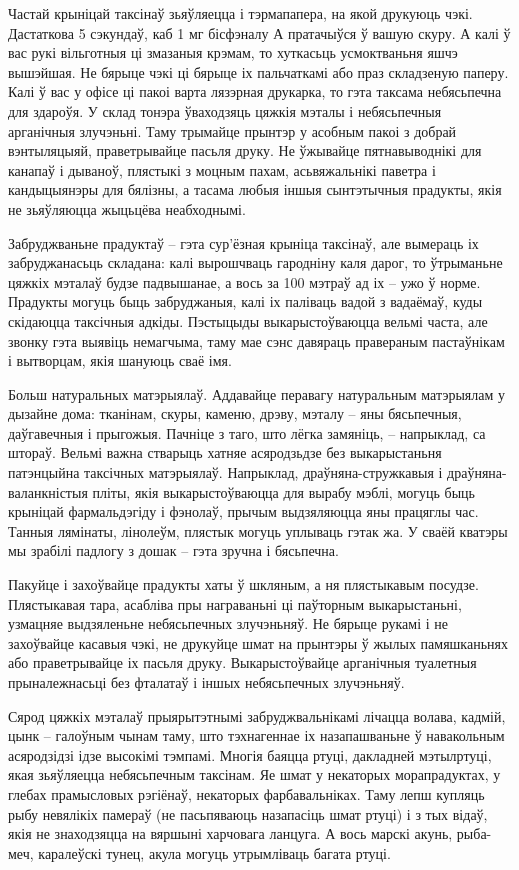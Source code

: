 Частай крыніцай таксінаў зьяўляецца і тэрмапапера, на якой друкуюць чэкі. Дастаткова 5 сэкундаў, каб 1 мг бісфэналу А пратачыўся ў вашую скуру. А калі ў вас рукі вільготныя ці змазаныя крэмам, то хуткасьць усмоктваньня яшчэ вышэйшая. Не бярыце чэкі ці бярыце іх пальчаткамі або праз складзеную паперу. Калі ў вас у офісе ці пакоі варта лязэрная друкарка, то гэта таксама небясьпечна для здароўя. У склад тонэра ўваходзяць цяжкія мэталы і небясьпечныя арганічныя злучэньні. Таму трымайце прынтэр у асобным пакоі з добрай вэнтыляцыяй, праветрывайце пасьля друку. Не ўжывайце пятнавыводнікі для канапаў і дываноў, плястыкі з моцным пахам, асьвяжальнікі паветра і кандыцыянэры для бялізны, а тасама любыя іншыя сынтэтычныя прадукты, якія не зьяўляюцца жыцьцёва неабходнымі.

Забруджваньне прадуктаў – гэта сур'ёзная крыніца таксінаў, але вымераць іх забруджанасьць складана: калі вырошчваць гародніну каля дарог, то ўтрыманьне цяжкіх мэталаў будзе падвышанае, а вось за 100 мэтраў ад іх – ужо ў норме. Прадукты могуць быць забруджаныя, калі іх паліваць вадой з вадаёмаў, куды скідаюцца таксічныя адкіды. Пэстыцыды выкарыстоўваюцца вельмі часта, але звонку гэта выявіць немагчыма, таму мае сэнс давяраць правераным пастаўнікам і вытворцам, якія шануюць сваё імя.

Больш натуральных матэрыялаў. Аддавайце перавагу натуральным матэрыялам у дызайне дома: тканінам, скуры, каменю, дрэву, мэталу – яны бясьпечныя, даўгавечныя і прыгожыя. Пачніце з таго, што лёгка замяніць, – напрыклад, са штораў. Вельмі важна стварыць хатняе асяродзьдзе без выкарыстаньня патэнцыйна таксічных матэрыялаў. Напрыклад, драўняна-стружкавыя і драўняна-валанкністыя пліты, якія выкарыстоўваюцца для вырабу мэблі, могуць быць крыніцай фармальдэгіду і фэнолаў, прычым выдзяляюцца яны працяглы час. Танныя лямінаты, лінолеўм, плястык могуць уплываць гэтак жа. У сваёй кватэры мы зрабілі падлогу з дошак – гэта зручна і бясьпечна.

Пакуйце і захоўвайце прадукты хаты ў шкляным, а ня плястыкавым посудзе. Плястыкавая тара, асабліва пры награваньні ці паўторным выкарыстаньні, узмацняе выдзяленьне небясьпечных злучэньняў. Не бярыце рукамі і не захоўвайце касавыя чэкі, не друкуйце шмат на прынтэры ў жылых памяшканьнях або праветрывайце іх пасьля друку. Выкарыстоўвайце арганічныя туалетныя прыналежнасьці без фталатаў і іншых небясьпечных злучэньняў.

Сярод цяжкіх мэталаў прыярытэтнымі забруджвальнікамі лічацца волава, кадмій, цынк – галоўным чынам таму, што тэхнагеннае іх назапашваньне ў навакольным асяродзідзі ідзе высокімі тэмпамі. Многія баяцца ртуці, дакладней мэтылртуці, якая зьяўляецца небясьпечным таксінам. Яе шмат у некаторых морапрадуктах, у глебах прамысловых рэгіёнаў, некаторых фарбавальніках. Таму лепш купляць рыбу невялікіх памераў (не пасьпяваюць назапасіць шмат ртуці) і з тых відаў, якія не знаходзяцца на вяршыні харчовага ланцуга. А вось марскі акунь, рыба-меч, каралеўскі тунец, акула могуць утрымліваць багата ртуці.

